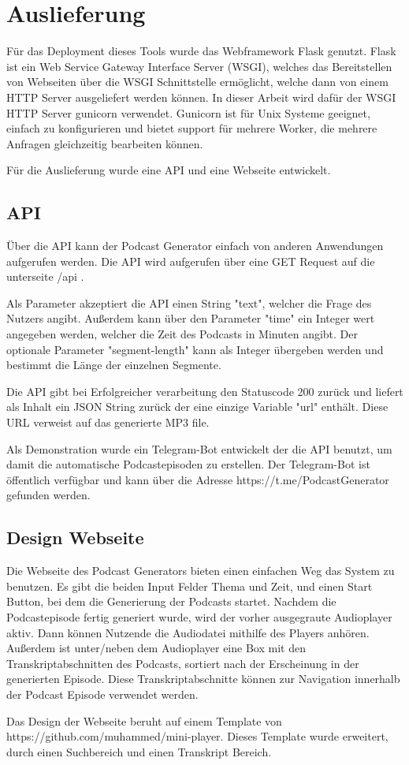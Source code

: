 \section{Auslieferung}

Für das Deployment dieses Tools wurde das Webframework Flask genutzt.
Flask ist ein Web Service Gateway Interface Server (WSGI), welches das Bereitstellen von Webseiten über die WSGI Schnittstelle ermöglicht, welche dann von einem HTTP Server ausgeliefert werden können.
In dieser Arbeit wird dafür der WSGI HTTP Server gunicorn verwendet.
Gunicorn ist für Unix Systeme geeignet, einfach zu konfigurieren und bietet support für mehrere Worker, die mehrere Anfragen gleichzeitig bearbeiten können.

Für die Auslieferung wurde eine API und eine Webseite entwickelt.

\subsection{API}

Über die API kann der Podcast Generator einfach von anderen Anwendungen aufgerufen werden.
Die API wird aufgerufen über eine GET Request auf die unterseite /api .

Als Parameter akzeptiert die API einen String "text", welcher die Frage des Nutzers angibt.
Außerdem kann über den Parameter "time" ein Integer wert angegeben werden, welcher die Zeit des Podcasts in Minuten angibt.
Der optionale Parameter "segment-length" kann als Integer übergeben werden und bestimmt die Länge der einzelnen Segmente.

Die API gibt bei Erfolgreicher verarbeitung den Statuscode 200 zurück und liefert als Inhalt ein JSON String zurück der eine einzige Variable "url" enthält.
Diese URL verweist auf das generierte MP3 file.

Als Demonstration wurde ein Telegram-Bot entwickelt der die API benutzt, um damit die automatische Podcastepisoden zu erstellen.
Der Telegram-Bot ist öffentlich verfügbar und kann über die Adresse https://t.me/PodcastGenerator gefunden werden.

\subsection{Design Webseite}

Die Webseite des Podcast Generators bieten einen einfachen Weg das System zu benutzen.
Es gibt die beiden Input Felder Thema und Zeit, und einen Start Button, bei dem die Generierung der Podcasts startet.
Nachdem die Podcastepisode fertig generiert wurde, wird der vorher ausgegraute Audioplayer aktiv.
Dann können Nutzende die Audiodatei mithilfe des Players anhören.
Außerdem ist unter/neben dem Audioplayer eine Box mit den Transkriptabschnitten des Podcasts, sortiert nach der Erscheinung in der generierten Episode.
Diese Transkriptabschnitte können zur Navigation innerhalb der Podcast Episode verwendet werden.


Das Design der Webseite beruht auf einem Template von https://github.com/muhammed/mini-player.
Dieses Template wurde erweitert, durch einen Suchbereich und einen Transkript Bereich.



